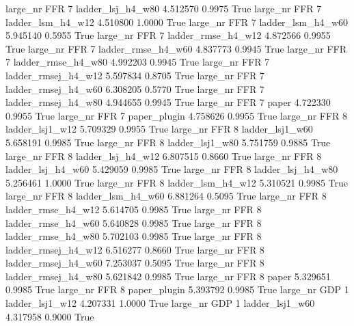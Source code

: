   large_nr      FFR                 7   ladder_lsj_h4_w80    4.512570      0.9975    True
  large_nr      FFR                 7   ladder_lsm_h4_w12    4.510800      1.0000    True
  large_nr      FFR                 7   ladder_lsm_h4_w60    5.945140      0.5955    True
  large_nr      FFR                 7  ladder_rmse_h4_w12    4.872566      0.9955    True
  large_nr      FFR                 7  ladder_rmse_h4_w60    4.837773      0.9945    True
  large_nr      FFR                 7  ladder_rmse_h4_w80    4.992203      0.9945    True
  large_nr      FFR                 7 ladder_rmsej_h4_w12    5.597834      0.8705    True
  large_nr      FFR                 7 ladder_rmsej_h4_w60    6.308205      0.5770    True
  large_nr      FFR                 7 ladder_rmsej_h4_w80    4.944655      0.9945    True
  large_nr      FFR                 7               paper    4.722330      0.9955    True
  large_nr      FFR                 7        paper_plugin    4.758626      0.9955    True
  large_nr      FFR                 8     ladder_lsj1_w12    5.709329      0.9955    True
  large_nr      FFR                 8     ladder_lsj1_w60    5.658191      0.9985    True
  large_nr      FFR                 8     ladder_lsj1_w80    5.751759      0.9885    True
  large_nr      FFR                 8   ladder_lsj_h4_w12    6.807515      0.8660    True
  large_nr      FFR                 8   ladder_lsj_h4_w60    5.429059      0.9985    True
  large_nr      FFR                 8   ladder_lsj_h4_w80    5.256461      1.0000    True
  large_nr      FFR                 8   ladder_lsm_h4_w12    5.310521      0.9985    True
  large_nr      FFR                 8   ladder_lsm_h4_w60    6.881264      0.5095    True
  large_nr      FFR                 8  ladder_rmse_h4_w12    5.614705      0.9985    True
  large_nr      FFR                 8  ladder_rmse_h4_w60    5.640828      0.9985    True
  large_nr      FFR                 8  ladder_rmse_h4_w80    5.702103      0.9985    True
  large_nr      FFR                 8 ladder_rmsej_h4_w12    6.516277      0.8660    True
  large_nr      FFR                 8 ladder_rmsej_h4_w60    7.253037      0.5095    True
  large_nr      FFR                 8 ladder_rmsej_h4_w80    5.621842      0.9985    True
  large_nr      FFR                 8               paper    5.329651      0.9985    True
  large_nr      FFR                 8        paper_plugin    5.393792      0.9985    True
  large_nr      GDP                 1     ladder_lsj1_w12    4.207331      1.0000    True
  large_nr      GDP                 1     ladder_lsj1_w60    4.317958      0.9000    True
